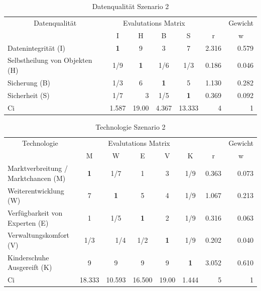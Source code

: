 \begin{table}[htbp]
\caption{Datenqualität Szenario 2}
\begin{tabular}{|l|c|c|c|c|r|r|}
\hline
\multicolumn{ 1}{|c|}{Datenqualität} & \multicolumn{ 4}{c|}{Evalutations Matrix} & \multicolumn{1}{l|}{} & \multicolumn{1}{l|}{Gewicht} \\ \cline{ 2- 7}
\multicolumn{ 1}{|c|}{} & I & H & B & S & \multicolumn{1}{c|}{r} & \multicolumn{1}{c|}{w} \\ \hline
Datenintegrität (I) & \textbf{1} & 9 & 3 & 7 & 2.316 & 0.579 \\ \hline
Selbstheilung von Objekten (H) &  1/9 & \textbf{1} &  1/6 &  1/3 & 0.186 & 0.046 \\ \hline
Sicherung (B) &  1/3 & 6 & \textbf{1} & 5 & 1.130 & 0.282 \\ \hline
Sicherheit (S) &  1/7 & \multicolumn{1}{r|}{3    } &  1/5 & \textbf{1} & 0.369 & 0.092 \\ \hline  \hline
Ci & \multicolumn{1}{r|}{1.587} & \multicolumn{1}{r|}{19.00} & \multicolumn{1}{r|}{4.367} & \multicolumn{1}{r|}{13.333} & 4 & 1 \\ \hline
\end{tabular}
\label{AHPDatenqualitätS2}
\end{table}

\begin{table}[htbp]
\caption{Technologie Szenario 2}
\begin{tabular}{|p{3.9cm}|c|c|c|c|c|r|r|}
\hline
\multicolumn{ 1}{|c|}{Technologie} & \multicolumn{ 5}{c|}{Evalutations Matrix} & \multicolumn{1}{l|}{} & \multicolumn{1}{l|}{Gewicht} \\ \cline{ 2- 8}
\multicolumn{ 1}{|c|}{} & M & W & E & V & K & \multicolumn{1}{c|}{r} & \multicolumn{1}{c|}{w} \\ \hline
Marktverbreitung / Marktchancen (M) & \textbf{1} &  1/7 & 1 & 3 &  1/9 & 0.363 & 0.073 \\ \hline
Weiterentwicklung (W) & 7 & \textbf{1} & 5 & 4 &  1/9 & 1.067 & 0.213 \\ \hline
Verfügbarkeit von Experten (E) & 1 &  1/5 & \textbf{1} & 2 &  1/9 & 0.316 & 0.063 \\ \hline
Verwaltungskomfort (V) &  1/3 & \multicolumn{1}{r|}{ 1/4} &  1/2 & \textbf{1} &  1/9 & 0.202 & 0.040 \\ \hline
Kinderschuhe Ausgereift (K) & 9 & 9 & 9 & 9 & \textbf{1} & 3.052 & 0.610 \\ \hline  \hline
Ci & \multicolumn{1}{r|}{18.333} & \multicolumn{1}{r|}{10.593} & \multicolumn{1}{r|}{16.500} & \multicolumn{1}{r|}{19.00} & \multicolumn{1}{r|}{1.444} & 5 & 1 \\ \hline
\end{tabular}
\label{AHPTechnologieS2}
\end{table}


